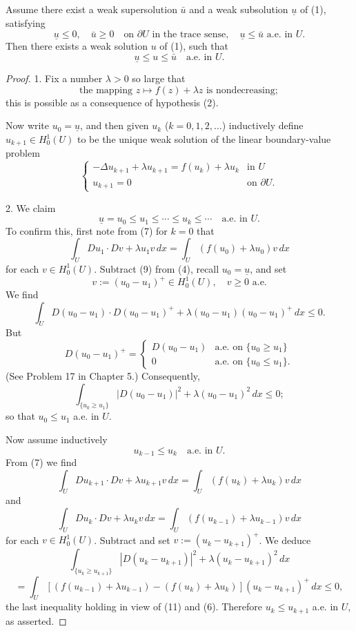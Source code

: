 \begin{theorem}
\label{thm:existence-between-sub-supersolutions}
Assume there exist a weak supersolution $\bar{u}$ and a weak subsolution $\underline{u}$ of (1), satisfying
\[
\underline{u} \leq 0, \quad \bar{u} \geq 0 \quad \text{on } \partial U \text{ in the trace sense}, \quad \underline{u} \leq \bar{u} \text{ a.e. in } U.
\tag{5}
\]
Then there exists a weak solution $u$ of (1), such that
\[
\underline{u} \leq u \leq \bar{u} \quad \text{a.e. in } U.
\]
\end{theorem}
\begin{proof}
1. Fix a number $\lambda > 0$ so large that
\[
\text{the mapping } z \mapsto f(z) + \lambda z \text{ is nondecreasing};
\tag{6}
\]
this is possible as a consequence of hypothesis (2).

Now write $u_0 = \underline{u}$, and then given $u_k$ ($k = 0, 1, 2, \ldots$) inductively define $u_{k+1} \in H_0^1(U)$ to be the unique weak solution of the linear boundary-value problem
\[
\begin{cases}
-\Delta u_{k+1} + \lambda u_{k+1} = f(u_k) + \lambda u_k & \text{in } U \\
u_{k+1} = 0 & \text{on } \partial U.
\end{cases}
\tag{7}
\]

2. We claim
\[
\underline{u} = u_0 \leq u_1 \leq \cdots \leq u_k \leq \cdots \quad \text{a.e. in } U.
\tag{8}
\]
To confirm this, first note from (7) for $k = 0$ that
\[
\int_U Du_1 \cdot Dv + \lambda u_1 v \, dx = \int_U (f(u_0) + \lambda u_0)v \, dx
\tag{9}
\]
for each $v \in H_0^1(U)$. Subtract (9) from (4), recall $u_0 = \underline{u}$, and set
\[
v := (u_0 - u_1)^+ \in H_0^1(U), \quad v \geq 0 \text{ a.e.}
\]
We find
\[
\int_U D(u_0 - u_1) \cdot D(u_0 - u_1)^+ + \lambda(u_0 - u_1)(u_0 - u_1)^+ \, dx \leq 0.
\tag{10}
\]
But
\[
D(u_0 - u_1)^+ = \begin{cases} D(u_0 - u_1) & \text{a.e. on } \{u_0 \geq u_1\} \\ 0 & \text{a.e. on } \{u_0 \leq u_1\}. \end{cases}
\]
(See Problem 17 in Chapter 5.) Consequently,
\[
\int_{\{u_0 \geq u_1\}} |D(u_0 - u_1)|^2 + \lambda(u_0 - u_1)^2 \, dx \leq 0;
\]
so that $u_0 \leq u_1$ a.e. in $U$.

Now assume inductively
\[
u_{k-1} \leq u_k \quad \text{a.e. in } U.
\tag{11}
\]
From (7) we find
\[
\int_U Du_{k+1} \cdot Dv + \lambda u_{k+1}v \, dx = \int_U (f(u_k) + \lambda u_k)v \, dx
\tag{12}
\]
and
\[
\int_U Du_k \cdot Dv + \lambda u_k v \, dx = \int_U (f(u_{k-1}) + \lambda u_{k-1})v \, dx
\]
for each $v \in H_0^1(U)$. Subtract and set $v := (u_k - u_{k+1})^+$. We deduce
\[
\int_{\{u_k \geq u_{k+1}\}} |D(u_k - u_{k+1})|^2 + \lambda(u_k - u_{k+1})^2 \, dx
\]
\[
= \int_U [(f(u_{k-1}) + \lambda u_{k-1}) - (f(u_k) + \lambda u_k)](u_k - u_{k+1})^+ \, dx \leq 0,
\]
the last inequality holding in view of (11) and (6). Therefore $u_k \leq u_{k+1}$ a.e. in $U$, as asserted.


\end{proof}
